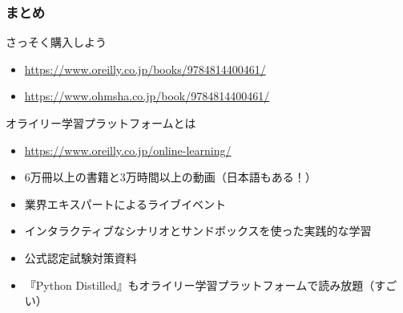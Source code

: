 \documentclass[aspectratio=169,dvipdfmx,12pt,notheorems]{beamer}
\theoremstyle{definition}
\begin{document}
\begin{frame}\frametitle{まとめ}

\begin{block}{さっそく購入しよう}
\begin{itemize}
\item \url{https://www.oreilly.co.jp/books/9784814400461/}
\item \url{https://www.ohmsha.co.jp/book/9784814400461/}
\end{itemize}
\end{block}

\begin{block}{オライリー学習プラットフォームとは}
\begin{itemize}
\item \url{https://www.oreilly.co.jp/online-learning/}
\item 6万冊以上の書籍と3万時間以上の動画（日本語もある！）
\item 業界エキスパートによるライブイベント
\item インタラクティブなシナリオとサンドボックスを使った実践的な学習
\item 公式認定試験対策資料
\item 『Python Distilled』もオライリー学習プラットフォームで読み放題（すごい）
\end{itemize}
\end{block}

\end{frame}
\end{document}
